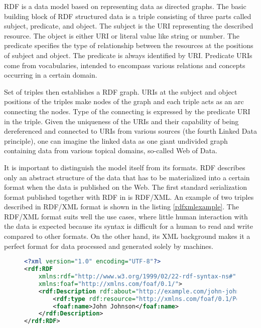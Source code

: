 RDF is a data model based on representing data as directed graphs. The basic building block of RDF structured data is a triple consisting of three parts called subject, predicate, and object. The subject is the URI representing the described resource. The object is either URI or literal value like string or number. The predicate specifies the type of relationship between the resources at the positions of subject and object. The predicate is always identified by URI. Predicate URIs come from vocabularies, intended to encompass various relations and concepts occurring in a certain domain.

Set of triples then establishes a RDF graph. URIs at the subject and object positions of the triples make nodes of the graph and each triple acts as an arc connecting the nodes. Type of the connecting is expressed by the predicate URI in the triple. Given the uniqueness of the URIs and their capability of being dereferenced and connected to URIs from various sources (the fourth Linked Data principle), one can imagine the linked data as one giant undivided graph containing data from various topical domains, so-called Web of Data.

It is important to distinguish the model itself from its formats. RDF describes only an abstract structure of the data that has to be materialized into a certain format when the data is published on the Web. The first standard serialization format published together with RDF in \cite{rdfPrimer2004} is RDF/XML. An example of two triples described in RDF/XML format is shown in the listing \ref{rdfxmlexample}. The RDF/XML format suits well the use cases, where little human interaction with the data is expected because its syntax is difficult for a human to read and write compared to other formats. On the other hand, its XML background makes it a perfect format for data processed and generated solely by machines.

\begin{figure}[h]
\begin{lstlisting}[language = XML, caption={Example of RDF data described in RDF/XML format (Source: author)}, label={rdfxmlexample},captionpos=b escapeinside={(*@}{@*)}]
<?xml version="1.0" encoding="UTF-8"?>
<rdf:RDF
    xmlns:rdf="http://www.w3.org/1999/02/22-rdf-syntax-ns#"
    xmlns:foaf="http://xmlns.com/foaf/0.1/">
    <rdf:Description rdf:about="http://example.com/john-johnson">
        <rdf:type rdf:resource="http://xmlns.com/foaf/0.1/Person"/>
        <foaf:name>John Johnson</foaf:name>
    </rdf:Description>
</rdf:RDF>
\end{lstlisting}
\end{figure}


